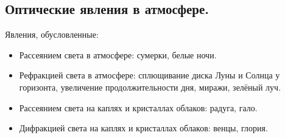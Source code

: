 \subsection{Оптические явления в атмосфере.}
Явления, обусловленные:
\begin{itemize}
\item Рассеянием света в атмосфере: сумерки, белые ночи.
\item Рефракцией света в атмосфере: сплющивание диска Луны и Солнца у горизонта, увеличение продолжительности дня, миражи, зелёный луч.
\item Рассеянием света на каплях и кристаллах облаков: радуга, гало.
\item Дифракцией света на каплях и кристаллах облаков: венцы, глория.
\end{itemize}
